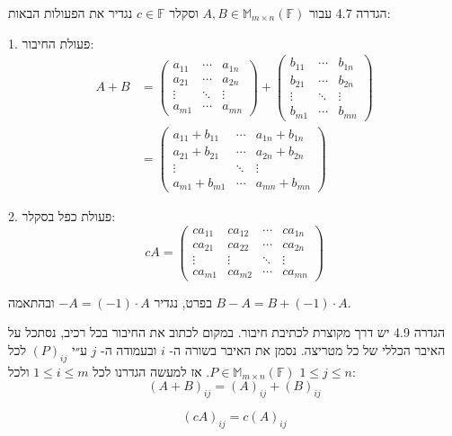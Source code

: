 \documentclass[a4paper, 11pt]{article}
\begin{document}
\begin{envbox}[defcolor]{הגדרה 4.7}
עבור $A,B\in\mathbb{M}_{m\times n}(\mathbb{F})$ וסקלר $c\in\mathbb{F}$ נגדיר את הפעולות הבאות:

1.  פעולת החיבור: 
\[
\begin{aligned}
    A+B&=\begin{pmatrix}a_{11} & \cdots & a_{1n}\\
    a_{21} & \cdots & a_{2n}\\
    \vdots  & \ddots & \vdots\\
    a_{m1}  & \cdots & a_{mn}
    \end{pmatrix}+\begin{pmatrix}b_{11} & \cdots & b_{1n}\\
    b_{21} & \cdots & b_{2n}\\
    \vdots & \ddots & \vdots\\
    b_{m1} & \cdots & b_{mn}
    \end{pmatrix}\\
    &=\begin{pmatrix}a_{11}+b_{11} & \cdots & a_{1n}+b_{1n} \\ a_{21}+b_{21} & \cdots & a_{2n}+b_{2n}\\
    \vdots & \ddots & \vdots\\
    a_{m1}+b_{m1} & \cdots & a_{mn}+b_{mn}
    \end{pmatrix}
    \end{aligned}
\]

2.  פעולת כפל בסקלר: 
\[
c A=\begin{pmatrix}ca_{11} & ca_{12} & \cdots & ca_{1n}\\
    ca_{21} & ca_{22} & \cdots & ca_{2n}\\
    \vdots & \vdots & \ddots & \vdots\\
    ca_{m1} & ca_{m2} & \cdots & ca_{mn}
    \end{pmatrix}
\]

    בפרט, נגדיר $-A=(-1)\cdot A$ ובהתאמה $B-A=B+(-1)\cdot A$.
\end{envbox}

\begin{envbox}[defcolor]{הגדרה 4.9}
יש דרך מקוצרת לכתיבת חיבור. במקום לכתוב את החיבור בכל רכיב, נסתכל על האיבר הכללי של כל מטריצה. נסמן את האיבר בשורה ה- $i$ ובעמודה ה- $j$ ע״י $(P)_{ij}$ לכל $P\in\mathbb{M}_{m\times n}(\mathbb{F})$. אז למעשה הגדרנו לכל $1\leq i \leq m$ ולכל $1\leq j\leq n$: 
\[
(A+B)_{ij}=(A)_{ij}+(B)_{ij}
\]

\[
(c A)_{ij}=c(A)_{ij}
\]
\end{envbox}
\end{document}
